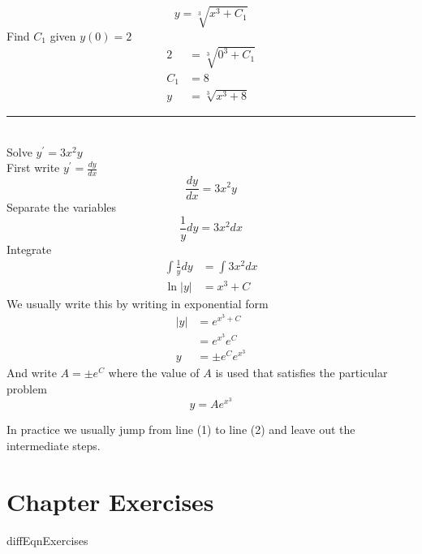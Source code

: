 \begin{equation*}y =\sqrt[{3}]{x^{3} +C_{1}}
\end{equation*}Find $C_{1}$ given $y (0) =2$
\begin{align*}2 &    = \sqrt[{3}]{0^{3} +C_{1}} \\
C_{1} &    = 8 \\
y &    = \sqrt[{3}]{x^{3} +8}\end{align*}
\rule{6.8cm}{0.5pt}\\
\example Solve $\displaystyle y^{ \prime } =3 x^{2} y$ \medskip\\
\solution First write $y^{ \prime } =\frac{d y}{d x}$ 
\begin{equation*}\frac{d y}{d x} =3 x^{2} y
\end{equation*}Separate the variables
\begin{equation*}\frac{1}{y} d y =3 x^{2} d x
\end{equation*}Integrate
\begin{align}\int \frac{1}{y} d y &    = \int 3 x^{2} d x \nonumber  \\
\ln  \left \vert y\right \vert  &    = x^{3} +C \tag{1}\end{align}We usually write this by writing in exponential form
\begin{align*}\left \vert y\right \vert  &    = e^{x^{3} +C} \\
 &    = e^{x^{3}} e^{C} \\
y &    =  \pm e^{C} e^{x^{3}}\end{align*}And write $A = \pm e^{C}$ where the value of $A$ is used that satisfies the particular problem
\begin{equation}y =A e^{x^{3}}\tag{2}
\end{equation}

In practice we usually jump from line (1) to line (2) and leave out the intermediate steps. 

\section{Chapter Exercises}
{diffEqnExercises}

